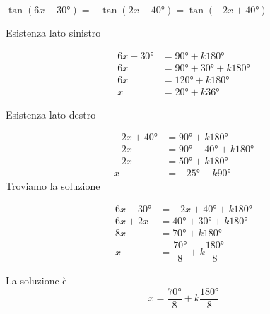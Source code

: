	 $\tan(6x-\ang{30;;})=-\tan(2x-\ang{40;;})=\tan(-2x+\ang{40;;})$

	Esistenza lato sinistro

	\begin{align*}
		6x-\ang{30;;}&=\ang{90;;}+k\ang{180;;}\\
		6x&=\ang{90;;}+\ang{30;;}+k\ang{180;;}\\
		6x&=\ang{120;;}+k\ang{180;;}\\
		x&=\ang{20;;}+k\ang{36;;}
		\end{align*}

	Esistenza lato destro

	\begin{align*}
		-2x+\ang{40;;}&=\ang{90;;}+k\ang{180;;}\\
		-2x&=\ang{90;;}-\ang{40;;}+k\ang{180;;}\\
		-2x&=\ang{50;;}+k\ang{180;;}\\
		x&=-\ang{25;;}+k\ang{90;;}
		\end{align*}
	Troviamo la soluzione

		\begin{align*}
		6x-\ang{30;;}&=-2x+\ang{40;;}+k\ang{180;;}\\
		6x+2x&=\ang{40;;}+\ang{30;;}+k\ang{180;;}\\
		8x&=\ang{70;;}+k\ang{180;;}\\
		x&=\dfrac{\ang{70;;}}{8}+k\dfrac{\ang{180;;}}{8}
		\end{align*}

	La soluzione è
	\[x=\dfrac{\ang{70;;}}{8}+k\dfrac{\ang{180;;}}{8}\]
